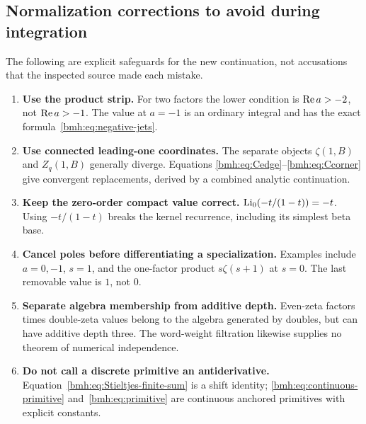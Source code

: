 \subsection{Normalization corrections to avoid during integration}
The following are explicit safeguards for the new continuation, not
accusations that the inspected source made each mistake.
\begin{enumerate}[leftmargin=2em,itemsep=5pt]
\item \textbf{Use the product strip.} For two factors the lower condition
is $\operatorname{Re} a>-2$, not $\operatorname{Re} a>-1$. The value at $a=-1$ is an ordinary
integral and has the exact formula~\eqref{bmh:eq:negative-jets}.
\item \textbf{Use connected leading-one coordinates.} The separate
objects $\zeta(1,B)$ and $Z_q(1,B)$ generally diverge. Equations
\eqref{bmh:eq:Cedge}--\eqref{bmh:eq:Ccorner} give convergent replacements,
derived by a combined analytic continuation.
\item \textbf{Keep the zero-order compact value correct.}
$\operatorname{Li}_0(-t/(1-t))=-t$. Using $-t/(1-t)$ breaks the kernel recurrence,
including its simplest beta base.
\item \textbf{Cancel poles before differentiating a specialization.}
Examples include $a=0,-1$, $s=1$, and the one-factor product
$s\zeta(s+1)$ at $s=0$. The last removable value is $1$, not $0$.
\item \textbf{Separate algebra membership from additive depth.}
Even-zeta factors times double-zeta values belong to the algebra generated
by doubles, but can have additive depth three. The word-weight filtration
likewise supplies no theorem of numerical independence.
\item \textbf{Do not call a discrete primitive an antiderivative.}
Equation~\eqref{bmh:eq:Stieltjes-finite-sum} is a shift identity;
\eqref{bmh:eq:continuous-primitive} and~\eqref{bmh:eq:primitive} are
continuous anchored primitives with explicit constants.
\end{enumerate}

